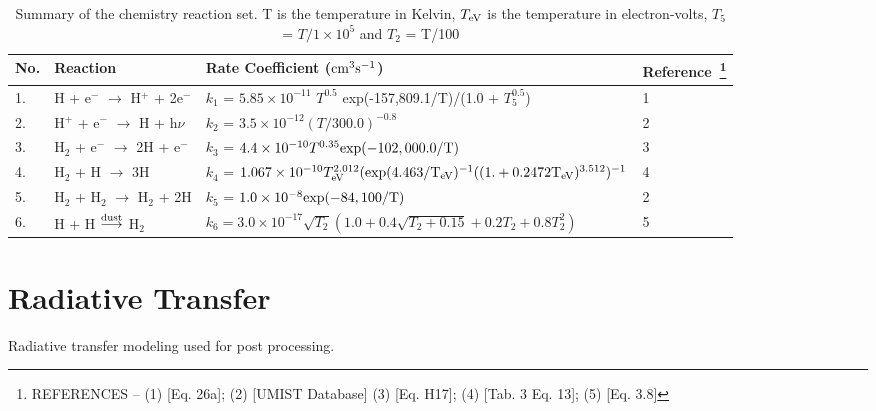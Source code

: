 \documentclass[useAMS,usenatbib,letters]{mn2e}
\begin{document}
\begin{table*}
\begin{minipage}{\textwidth}
\caption{Summary of the chemistry reaction set. T is the temperature
  in Kelvin, $T_{\rm eV}$ is the temperature in electron-volts, $T_{5}$
  = $T/1\times10^{5}$  and 
$T_{2}$  = T/100}
\label{tab:chemeq}
\begin{tabular}{l l l l}
\hline
No. & Reaction & Rate Coefficient ($\rm {cm}^{3} s^{-1}$) &
Reference~\footnote{REFERENCES -- (1) \cite{Cen:1992p13616} [Eq. 26a];
  (2) \cite{Woodall:2007p13623} [UMIST Database] (3)
  \cite{Galli:1998p13066} [Eq. H17]; (4) \cite{Abel:1997p12836}
  [Tab. 3 Eq. 13]; (5) \cite{Hollenbach:1979p12707} [Eq. 3.8]}\\
\hline
1. & H + e$^{-}$ $\rightarrow$ H$^{+}$ + 2e$^{-}$ & $k_1$ = $5.85
\times 10^{-11}$ $T^{0.5}$ \rm{exp}(-157,809.1/T)/(1.0 + $T_{5}^{0.5}$) & 1\\
2. & H$^{+}$ + e$^{-}$ $\rightarrow$ H + h$\nu$ & $k_2$ =
$3.5\times10^{-12} (T/300.0)^{-0.8}$ & 2\\
3. & H$_{2}$ + e$^{-}$ $\rightarrow$ 2H + e$^{-}$ & $k_3$ =
$4.4\times10^{-10} T^{0.35} \rm{exp}(-102,000.0/T)$ & 3\\
4. & H$_{2}$ + H $\rightarrow$ 3H & $k_4$ = $1.067\times10^{-10}
T_{\rm eV}^{2.012}(\rm{exp}(4.463/T_{\rm eV})^{-1}((1. + 0.2472 T_{\rm eV})^{3.512})^{-1} $& 4\\
5. &H$_{2}$ + H$_{2}$ $\rightarrow$ H$_{2}$ + 2H & $k_5$ = $1.0\times 10^{-8} \rm{exp}(-84,100/T)$ & 2\\
6. & H + H $\overset{\rm dust}\longrightarrow$ H$_{2}$ & $k_6 =
3.0\times10^{-17}\sqrt{T_{2}}(1.0 + 0.4\sqrt{T_{2} + 0.15} + 0.2T_{2} + 0.8T_{2}^{2})$ & 5 \\
\hline
\end{tabular}
\end{minipage}
\end{table*}

\section{Radiative Transfer}
\label{sec:radtrans}
Radiative transfer modeling used for post processing.
\end{document}
